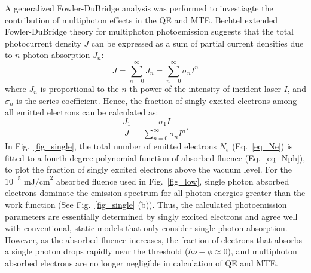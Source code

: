 A generalized Fowler-DuBridge analysis\cite{Fowler1931,DuBridge1933} was performed to investiagte the contribution of multiphoton effects in the QE and MTE. Bechtel extended Fowler-DuBridge theory for multiphoton photoemission suggests that the total photocurrent density $J$ can be expressed as a sum of partial current densities due to $n$-photon absorption $J_n$:\cite{Bechtel1977,Ferrini2009,multiphoton_musumeci}
\begin{equation}
	J = \sum_{n = 0}^{\infty} J_n = \sum_{n = 0}^{\infty} \sigma_n I^n
\end{equation}
where $J_n$ is proportional to the $n$-th power of the intensity of incident laser $I$, and $\sigma_{n}$ is the series coefficient. Hence, the fraction of singly excited electrons among all emitted electrons can be calculated as:\cite{An2018}
\begin{equation}\label{eq_single}
	\frac{J_1}{J} = \frac{\sigma_1 I}{\sum_{n=0}^\infty \sigma_n I^n}.
\end{equation}
In Fig.~\ref{fig_single}, the total number of emitted electrons $N_e$ (Eq.~\ref{eq_Ne}) is fitted to a fourth degree polynomial function of absorbed fluence (Eq.~\ref{eq_Nph}), to plot the fraction of singly excited electrons above the vacuum level.
For the $10^{-5} \textrm{ mJ/cm}^2$ absorbed fluence used in Fig.~\ref{fig_low}, single photon absorbed electrons dominate the emission spectrum for all photon energies greater than the work function (See Fig.~\ref{fig_single} (b)). Thus, the calculated photoemission parameters are essentially determined by singly excited electrons and agree well with conventional, static models that only consider single photon absorption. However, as the absorbed fluence increases, the fraction of electrons that absorbs a single photon drops rapidly near the threshold ($h\nu - \phi \approx 0$), and multiphoton absorbed electrons are no longer negligible in calculation of QE and MTE.



